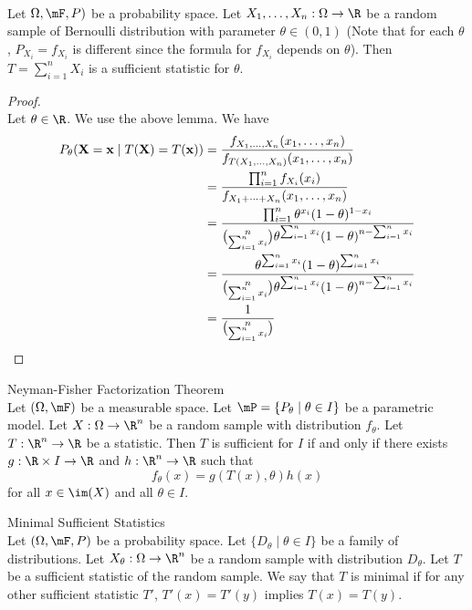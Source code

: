 \documentclass[a4paper]{article}
\begin{document}
\begin{eg}{}{}\\
Let $\Omega,\mF,P)$ be a probability space. Let $X_1,\dots,X_n:\Omega\to\R$ be a random sample of Bernoulli distribution with parameter $\theta\in(0,1)$ (Note that for each $\theta$, $P_{X_i}=f_{X_i}$ is different since the formula for $f_{X_i}$ depends on $\theta$). Then $T=\sum_{i=1}^nX_i$ is a sufficient statistic for $\theta$. 
\begin{proof}\\
Let $\theta\in\R$. We use the above lemma. We have
\begin{align*}
P_\theta(\bold{X}=\bold{x}\;|\;T(\bold{X})=T(\bold{x}))&=\frac{f_{X_1,\dots,X_n}(x_1,\dots,x_n)}{f_{T(X_1,\dots,X_n)}(x_1,\dots,x_n)}\\
&=\frac{\prod_{i=1}^nf_{X_i}(x_i)}{f_{X_1+\dots+X_n}(x_1,\dots,x_n)}\\
&=\frac{\prod_{i=1}^n\theta^{x_i}(1-\theta)^{1-x_i}}{\binom{n}{\sum_{i=1}^nx_i}\theta^{\sum_{i=1}^nx_i}(1-\theta)^{n-\sum_{i=1}^nx_i}}\\
&=\frac{\theta^{\sum_{i=1}^nx_i}(1-\theta)^{\sum_{i=1}^nx_i}}{\binom{n}{\sum_{i=1}^nx_i}\theta^{\sum_{i=1}^nx_i}(1-\theta)^{n-\sum_{i=1}^nx_i}}\\
&=\frac{1}{\binom{n}{\sum_{i=1}^nx_i}}
\end{align*}
\end{proof}
\end{eg}

\begin{thm}{Neyman-Fisher Factorization Theorem}{}\\
Let $(\Omega,\mF)$ be a measurable space. Let $\mP=\{P_\theta\;|\;\theta\in I\}$ be a parametric model. Let $X:\Omega\to\R^n$ be a random sample with distribution $f_\theta$. Let $T:\R^n\to\R$ be a statistic. Then $T$ is sufficient for $I$ if and only if there exists $g:\R\times I\to\R$ and $h:\R^n\to\R$ such that $$f_\theta(x)=g(T(x),\theta)h(x)$$ for all $x\in\im(X)$ and all $\theta\in I$. 
\end{thm}

\begin{defn}{Minimal Sufficient Statistics}{}\\
Let $(\Omega,\mF,P)$ be a probability space. Let $\{D_\theta\;|\;\theta\in I\}$ be a family of distributions. Let $X_\theta:\Omega\to\R^n$ be a random sample with distribution $D_\theta$. Let $T$ be a sufficient statistic of the random sample. We say that $T$ is minimal if for any other sufficient statistic $T'$, $T'(x)=T'(y)$ implies $T(x)=T(y)$. 
\end{defn}
\end{document}
